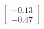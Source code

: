 \documentclass[preview]{standalone}
\begin{document}
\begin{align*}
\begin{bmatrix} -0.13 \\ -0.47 \end{bmatrix}
\end{align*}
\end{document}
